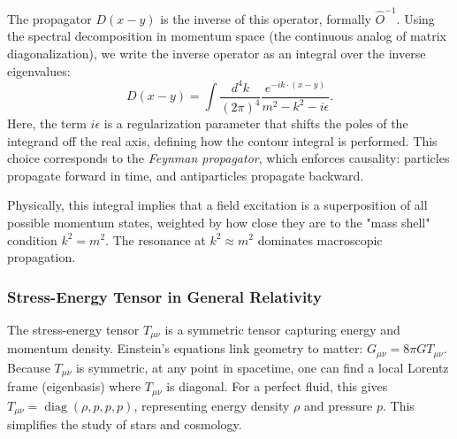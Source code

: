 The propagator $D(x-y)$ is the inverse of this operator, formally $\hat{O}^{-1}$. Using the spectral decomposition in momentum space (the continuous analog of matrix diagonalization), we write the inverse operator as an integral over the inverse eigenvalues:
\[
  D(x-y) = \int \frac{d^4k}{(2\pi)^4} \frac{e^{-ik \cdot (x-y)}}{m^2 - k^2 - i\epsilon}.
\]
Here, the term $i\epsilon$ is a regularization parameter that shifts the poles of the integrand off the real axis, defining how the contour integral is performed. This choice corresponds to the \emph{Feynman propagator}, which enforces causality: particles propagate forward in time, and antiparticles propagate backward.

\begin{center}
\end{center}

Physically, this integral implies that a field excitation is a superposition of all possible momentum states, weighted by how close they are to the "mass shell" condition $k^2 = m^2$. The resonance at $k^2 \approx m^2$ dominates macroscopic propagation.

\subsubsection{Stress-Energy Tensor in General Relativity}
The stress-energy tensor $T_{\mu\nu}$ is a symmetric tensor capturing energy and momentum density.
Einstein's equations link geometry to matter: $G_{\mu\nu} = 8\pi G T_{\mu\nu}$.
Because $T_{\mu\nu}$ is symmetric, at any point in spacetime, one can find a local Lorentz frame (eigenbasis) where $T_{\mu\nu}$ is diagonal.
For a perfect fluid, this gives $T_{\mu\nu} = \operatorname{diag}(\rho, p, p, p)$, representing energy density $\rho$ and pressure $p$. This simplifies the study of stars and cosmology.

